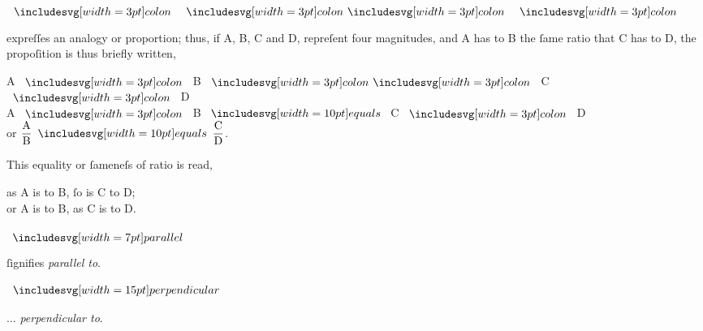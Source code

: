 \hfill

\hfill

\hfill

\hfill

\begin{minipage}[t]{0.20\textwidth}
    \begin{center}
        $\bcolon\ \bbcolon\ \bcolon$
    \end{center}
\end{minipage}%
\begin{minipage}[t]{0.80\textwidth}
    expreſſes an analogy or proportion; thus, if A, B, C and D, repreſent four magnitudes, and A has to B the ſame ratio that C has to D, the propoſition is thus briefly written,\\
    \begin{center}
        A $\bcolon$ B $\bbcolon$ C $\bcolon$ D\\
        A $\bcolon$ B $\bequals$ C $\bcolon$ D\\
        or $\dfrac{\text{A}}{\text{B}} \bequals \dfrac{\text{C}}{\text{D}}$.
    \end{center}
\end{minipage}

\begin{minipage}[t]{0.20\textwidth}
    \phantom{}
\end{minipage}
\begin{minipage}[t]{0.80\textwidth}
    This equality or ſameneſs of ratio is read,\\
    \begin{center}
        as A is to B, ſo is C to D;\\
        or A is to B, as C is to D.
    \end{center}
\end{minipage}

\begin{minipage}[t]{0.20\textwidth}
    \begin{center}
        $\bparallel$
    \end{center}
\end{minipage}
\begin{minipage}[t]{0.80\textwidth}
    ſignifies \textit{parallel to}.
\end{minipage}

\begin{minipage}[t]{0.20\textwidth}
    \begin{center}
        $\bperp$
    \end{center}
\end{minipage}
\begin{minipage}[t]{0.80\textwidth}
    $\ldots$ \textit{perpendicular to}.
\end{minipage}

